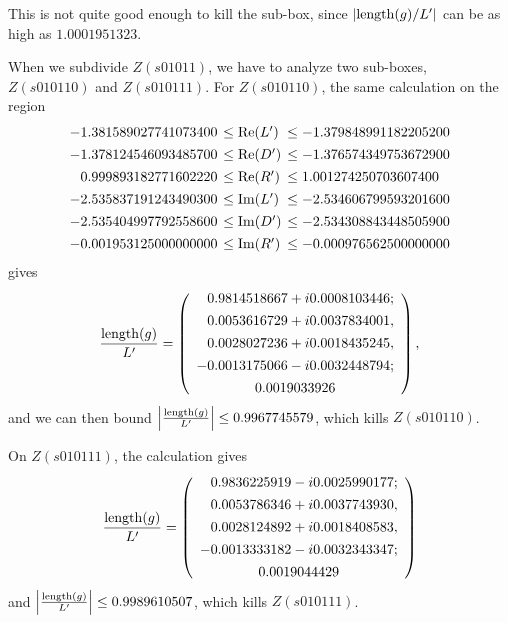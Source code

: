 This is not quite good enough to kill the sub-box, since
$|{\rm length}(g)/L'|$ can be as high as $1.0001951323$.

When we subdivide $Z(s01011)$, we have to analyze two sub-boxes,
$Z(s010110)$ and $Z(s010111)$.
For $Z(s010110)$, the same calculation on the region
$$\begin{array}{rll}
-1.381589027741073400 &\hskip-6pt \leq {\rm Re}(L') &\hskip-6pt\leq -1.379848991182205200\\[4pt]
-1.378124546093485700 &\hskip-6pt\leq {\rm Re}(D')
&\hskip-6pt\leq -1.376574349753672900\\[4pt]
0.999893182771602220 &\hskip-6pt\leq {\rm Re}(R')&\hskip-6pt \leq 1.001274250703607400\\[4pt]
-2.535837191243490300&\hskip-6pt \leq {\rm Im}(L')&\hskip-6pt \leq
-2.534606799593201600\\[4pt]
-2.535404997792558600 &\hskip-6pt\leq {\rm Im}(D') &\hskip-6pt\leq -2.534308843448505900\\[4pt]
-0.001953125000000000&\hskip-6pt \leq {\rm Im}(R')
&\hskip-6pt\leq -0.000976562500000000
\end{array} 
$$
gives 
$$
{{\rm length}(g) \over L'} = 
  \left(\begin{array}{c}
 \phantom{-}   0.9814518667 + i 0.0008103446;\\[4pt]
\phantom{-}      0.0053616729 + i 0.0037834001,\\[4pt]
  \phantom{-}    0.0028027236 + i 0.0018435245,\\[4pt]
    -0.0013175066 - i 0.0032448794;\\[4pt]
    0.0019033926
  \end{array}\right),
$$
and we can then bound $\left|{{\rm length}(g) \over L'}\right| \leq 0.9967745579$,
which kills $Z(s010110)$.  

On $Z(s010111)$, the calculation gives
$$
{{\rm length}(g) \over L'} =
  \left(\begin{array}{c}
\phantom{-}      0.9836225919 - i 0.0025990177;\\[4pt]
  \phantom{-}    0.0053786346 + i 0.0037743930,\\[4pt]
 \phantom{-}     0.0028124892 + i 0.0018408583,\\[4pt]
    -0.0013333182 - i 0.0032343347;\\[4pt]
    0.0019044429
  \end{array}\right)
$$
and $\left|{{\rm length}(g) \over L'}\right| \leq 0.9989610507$,
which kills $Z(s010111)$.

 
